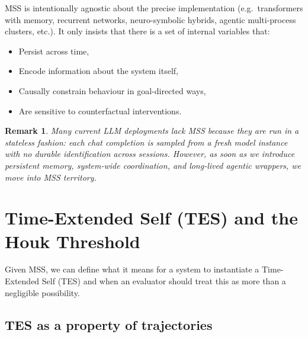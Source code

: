 \documentclass[11pt]{article}
\newtheorem{remark}{Remark}
\newcommand{\1}{\mathbf{1}}
\begin{document}
MSS is intentionally agnostic about the precise implementation
(e.g.~transformers with memory, recurrent networks, neuro-symbolic hybrids,
agentic multi-process clusters, etc.).
It only insists that there is a set of internal variables that:

\begin{itemize}[leftmargin=2em]
  \item Persist across time,
  \item Encode information about the system itself,
  \item Causally constrain behaviour in goal-directed ways,
  \item Are sensitive to counterfactual interventions.
\end{itemize}

\begin{remark}
Many current LLM deployments \emph{lack} MSS because they are run in a
stateless fashion: each chat completion is sampled from a fresh model instance
with no durable identification across sessions.
However, as soon as we introduce persistent memory, system-wide coordination,
and long-lived agentic wrappers, we move into MSS territory.
\end{remark}

\section{Time-Extended Self (TES) and the Houk Threshold}

Given MSS, we can define what it means for a system to instantiate a
Time-Extended Self (TES) and when an evaluator should treat this as more than
a negligible possibility.

\subsection{TES as a property of trajectories}
\end{document}
